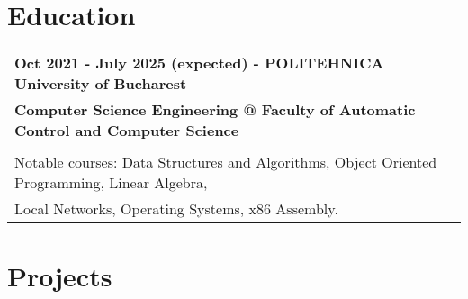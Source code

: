 \documentclass[a4paper,12pt]{article}
\begin{document}
\section{Education}
\begin{tabularx}{\linewidth}{@{}l X@{}}	
\textbf{Oct 2021 - July 2025 (expected) - POLITEHNICA University of Bucharest} \\ 
\textbf{Computer Science Engineering @ Faculty of Automatic Control and Computer Science} \\
\\
Notable courses: Data Structures and Algorithms, Object Oriented Programming, Linear Algebra,  \\ Local Networks, Operating Systems, x86 Assembly. \hfill
\end{tabularx}

\section{Projects}
\end{document}
